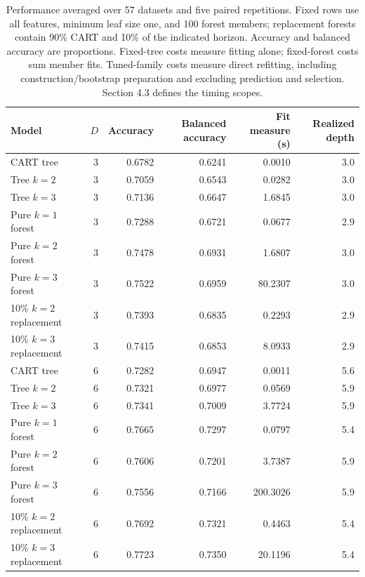 \documentclass[final,5p,times]{elsarticle}
\begin{document}
\begin{table}[t]
\centering\small
\caption{Performance averaged over 57 datasets and five paired repetitions.
Fixed rows use all features, minimum leaf size one, and 100 forest members;
replacement forests contain 90\% CART and 10\% of the indicated horizon.
Accuracy and balanced accuracy are proportions. Fixed-tree costs measure
fitting alone; fixed-forest costs sum member fits. Tuned-family costs measure
direct refitting, including construction/bootstrap preparation and excluding
prediction and selection. Section 4.3 defines the timing scopes.}
\label{tab:performance}
\begin{tabular}{@{}lrrrrr@{}}\toprule
Model & $D$ & Accuracy & Balanced accuracy & Fit measure (s) & Realized depth\\
\midrule
CART tree & 3 & 0.6782 & 0.6241 & 0.0010 & 3.0 \\
Tree $k=2$ & 3 & 0.7059 & 0.6543 & 0.0282 & 3.0 \\
Tree $k=3$ & 3 & 0.7136 & 0.6647 & 1.6845 & 3.0 \\
Pure $k=1$ forest & 3 & 0.7288 & 0.6721 & 0.0677 & 2.9 \\
Pure $k=2$ forest & 3 & 0.7478 & 0.6931 & 1.6807 & 3.0 \\
Pure $k=3$ forest & 3 & 0.7522 & 0.6959 & 80.2307 & 3.0 \\
10\% $k=2$ replacement & 3 & 0.7393 & 0.6835 & 0.2293 & 2.9 \\
10\% $k=3$ replacement & 3 & 0.7415 & 0.6853 & 8.0933 & 2.9 \\
\addlinespace
CART tree & 6 & 0.7282 & 0.6947 & 0.0011 & 5.6 \\
Tree $k=2$ & 6 & 0.7321 & 0.6977 & 0.0569 & 5.9 \\
Tree $k=3$ & 6 & 0.7341 & 0.7009 & 3.7724 & 5.9 \\
Pure $k=1$ forest & 6 & 0.7665 & 0.7297 & 0.0797 & 5.4 \\
Pure $k=2$ forest & 6 & 0.7606 & 0.7201 & 3.7387 & 5.9 \\
Pure $k=3$ forest & 6 & 0.7556 & 0.7166 & 200.3026 & 5.9 \\
10\% $k=2$ replacement & 6 & 0.7692 & 0.7321 & 0.4463 & 5.4 \\
10\% $k=3$ replacement & 6 & 0.7723 & 0.7350 & 20.1196 & 5.4 \\

\end{tabular}
\end{table}
\end{document}
